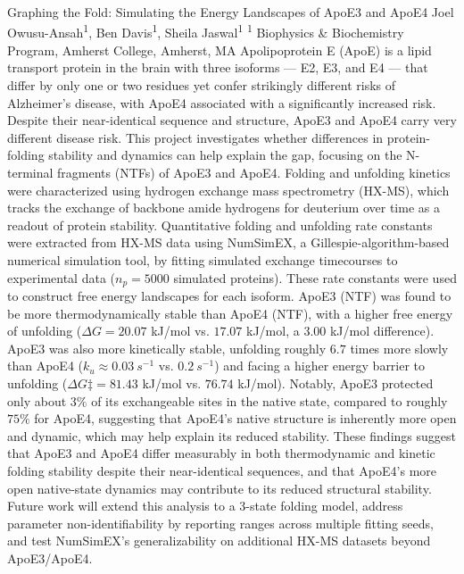 \makeabstract
    {
    Graphing the Fold: Simulating the Energy Landscapes of ApoE3 and ApoE4
    }
    {
    \vspace{-20pt}
    Joel Owusu-Ansah\textsuperscript{1}, Ben Davis\textsuperscript{1}, Sheila Jaswal\textsuperscript{1}
    }
    {
    \textsuperscript{1} Biophysics \& Biochemistry Program, Amherst College, Amherst, MA
    }
    {
    Apolipoprotein E (ApoE) is a lipid transport protein in the brain with three isoforms --- E2, E3, and E4 --- that differ by only one or two residues yet confer strikingly different risks of Alzheimer's disease, with ApoE4 associated with a significantly increased risk. Despite their near-identical sequence and structure, ApoE3 and ApoE4 carry very different disease risk. This project investigates whether differences in protein-folding stability and dynamics can help explain the gap, focusing on the N-terminal fragments (NTFs) of ApoE3 and ApoE4.
    }
    {
    Folding and unfolding kinetics were characterized using hydrogen exchange mass spectrometry (HX-MS), which tracks the exchange of backbone amide hydrogens for deuterium over time as a readout of protein stability. Quantitative folding and unfolding rate constants were extracted from HX-MS data using NumSimEX, a Gillespie-algorithm-based numerical simulation tool, by fitting simulated exchange timecourses to experimental data ($n_p = 5000$ simulated proteins). These rate constants were used to construct free energy landscapes for each isoform.
    }
    {
    ApoE3 (NTF) was found to be more thermodynamically stable than ApoE4 (NTF), with a higher free energy of unfolding ($\Delta G = 20.07$ kJ/mol vs. $17.07$ kJ/mol, a $3.00$ kJ/mol difference). ApoE3 was also more kinetically stable, unfolding roughly $6.7$ times more slowly than ApoE4 ($k_u \approx 0.03 \mathrm\ s^{-1}$ vs. $0.2 \mathrm\ s^{-1}$) and facing a higher energy barrier to unfolding ($\Delta G\ddagger = 81.43$ kJ/mol vs. $76.74$ kJ/mol). Notably, ApoE3 protected only about $3\%$ of its exchangeable sites in the native state, compared to roughly $75\%$ for ApoE4, suggesting that ApoE4's native structure is inherently more open and dynamic, which may help explain its reduced stability.
    }
    {
    These findings suggest that ApoE3 and ApoE4 differ measurably in both thermodynamic and kinetic folding stability despite their near-identical sequences, and that ApoE4's more open native-state dynamics may contribute to its reduced structural stability. Future work will extend this analysis to a 3-state folding model, address parameter non-identifiability by reporting ranges across multiple fitting seeds, and test NumSimEX's generalizability on additional HX-MS datasets beyond ApoE3/ApoE4.
    }

    \newpage
    